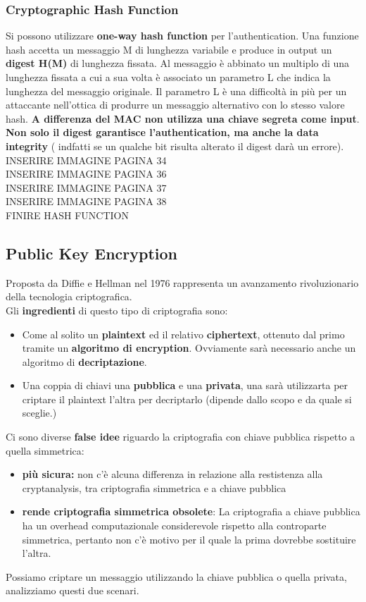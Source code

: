 \documentclass[12pt]{article}
\begin{document}
		\subsubsection{Cryptographic Hash Function}
			Si possono utilizzare \textbf{one-way hash function} per l'authentication. Una funzione hash accetta un messaggio M di lunghezza variabile e produce in output un \textbf{digest H(M)} di lunghezza fissata. Al messaggio è abbinato un multiplo di una lunghezza fissata a cui a sua volta è associato un parametro L che indica la lunghezza del messaggio originale. Il parametro L è una difficoltà in più per un attaccante nell'ottica di produrre un messaggio alternativo con lo stesso valore hash. \textbf{A differenza del MAC non utilizza una chiave segreta come input}.\\
			\textbf{Non solo il digest garantisce l'authentication, ma anche la data integrity} ( indfatti se un qualche bit risulta alterato il digest darà un errore).\\
			INSERIRE IMMAGINE PAGINA 34\\
			INSERIRE IMMAGINE PAGINA 36\\
			INSERIRE IMMAGINE PAGINA 37\\
			INSERIRE IMMAGINE PAGINA 38\\
			FINIRE HASH FUNCTION
	\subsection{Public Key Encryption}
		Proposta da Diffie e Hellman nel 1976 rappresenta un avanzamento rivoluzionario della tecnologia criptografica.\\
		Gli \textbf{ingredienti} di questo tipo di criptografia sono:
		\begin{itemize}
			\item Come al solito un \textbf{plaintext} ed il relativo \textbf{ciphertext}, ottenuto dal primo tramite un \textbf{algoritmo di encryption}. Ovviamente sarà necessario anche un algoritmo di \textbf{decriptazione}.
			\item Una coppia di chiavi una \textbf{pubblica} e una \textbf{privata}, una sarà utilizzarta per criptare il plaintext l'altra per decriptarlo (dipende dallo scopo e da quale si sceglie.)
		\end{itemize}
		Ci sono diverse \textbf{false idee} riguardo la criptografia con chiave pubblica rispetto a quella simmetrica:
		\begin{itemize}
			\item \textbf{più sicura:} non c'è alcuna differenza in relazione alla restistenza alla cryptanalysis, tra criptografia simmetrica e a chiave pubblica
			\item \textbf{rende criptografia simmetrica obsolete}: La criptografia a chiave pubblica ha un overhead computazionale considerevole rispetto alla controparte simmetrica, pertanto non c'è motivo per il quale la prima dovrebbe sostituire l'altra.
		\end{itemize}
		Possiamo criptare un messaggio utilizzando la chiave pubblica o quella privata, analizziamo questi due scenari.\\
\end{document}
